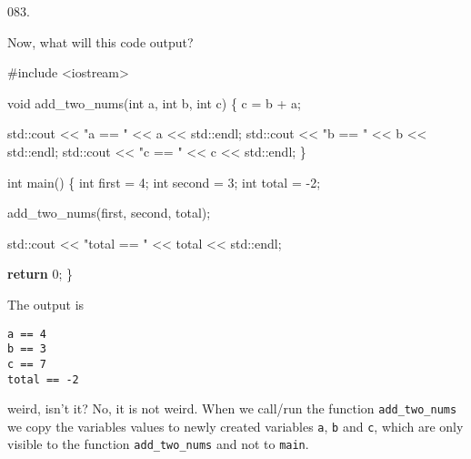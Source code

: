 \documentclass[]{book}
\newenvironment{Shaded}{}{}
\newcommand{\BuiltInTok}[1]{#1}
\newcommand{\ControlFlowTok}[1]{\textcolor[rgb]{0.00,0.44,0.13}{\textbf{#1}}}
\newcommand{\DataTypeTok}[1]{\textcolor[rgb]{0.56,0.13,0.00}{#1}}
\newcommand{\DecValTok}[1]{\textcolor[rgb]{0.25,0.63,0.44}{#1}}
\newcommand{\ImportTok}[1]{#1}
\newcommand{\NormalTok}[1]{#1}
\newcommand{\PreprocessorTok}[1]{\textcolor[rgb]{0.74,0.48,0.00}{#1}}
\newcommand{\StringTok}[1]{\textcolor[rgb]{0.25,0.44,0.63}{#1}}
\begin{document}
\vspace{2mm}\noindent\hrulefill{}

\begin{minipage}{\linewidth}\noindent
{\tiny 083.}\\
\begin{minipage}[t]{.485\linewidth}

Now, what will this code output?

\begin{framed}

\begin{Shaded}
\begin{Highlighting}[]
\PreprocessorTok{#include }\ImportTok{<iostream>}

\DataTypeTok{void}\NormalTok{ add_two_nums(}\DataTypeTok{int}\NormalTok{ a, }\DataTypeTok{int}\NormalTok{ b, }\DataTypeTok{int}\NormalTok{ c) \{}
\NormalTok{  c = b + a;}

  \BuiltInTok{std::}\NormalTok{cout << }\StringTok{"a == "}\NormalTok{ << a << }\BuiltInTok{std::}\NormalTok{endl;}
  \BuiltInTok{std::}\NormalTok{cout << }\StringTok{"b == "}\NormalTok{ << b << }\BuiltInTok{std::}\NormalTok{endl;}
  \BuiltInTok{std::}\NormalTok{cout << }\StringTok{"c == "}\NormalTok{ << c << }\BuiltInTok{std::}\NormalTok{endl;}
\NormalTok{\}}

\DataTypeTok{int}\NormalTok{ main() \{}
  \DataTypeTok{int}\NormalTok{ first  = }\DecValTok{4}\NormalTok{;}
  \DataTypeTok{int}\NormalTok{ second = }\DecValTok{3}\NormalTok{;}
  \DataTypeTok{int}\NormalTok{ total  = }\DecValTok{-2}\NormalTok{;}

\NormalTok{  add_two_nums(first, second, total);}

  \BuiltInTok{std::}\NormalTok{cout}
\NormalTok{    << }\StringTok{"total == "}\NormalTok{ << total << }\BuiltInTok{std::}\NormalTok{endl;}

  \ControlFlowTok{return} \DecValTok{0}\NormalTok{;}
\NormalTok{\}}
\end{Highlighting}
\end{Shaded}

\end{framed}

\end{minipage}
\hfill
\begin{minipage}[t]{.485\linewidth}

The output is

\begin{framed}

\begin{verbatim}
a == 4
b == 3
c == 7
total == -2
\end{verbatim}

\end{framed}

weird, isn't it? No, it is not weird. When we call/run the function
\texttt{add\_two\_nums} we copy the variables values to newly created
variables \texttt{a}, \texttt{b} and \texttt{c}, which are only visible
to the function \texttt{add\_two\_nums} and not to \texttt{main}.

\end{minipage}
\end{minipage}
\end{document}
